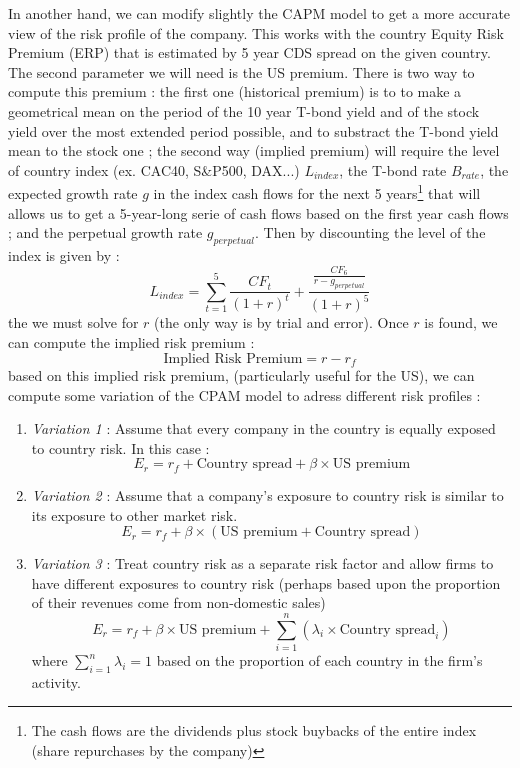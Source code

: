 In another hand, we can modify slightly the CAPM model to get a more accurate view of  the risk profile of the company. This works with the country Equity Risk Premium (ERP) that is estimated by 5 year CDS spread on the given country. The second parameter we will need is the US premium. There is two way to compute this premium : the first one (historical premium) is to to make a geometrical mean on the period of the 10 year T-bond yield and of the stock yield over the most extended period possible, and to substract the T-bond yield mean to the stock one ; the second way (implied premium) will require the level of country index (ex. CAC40, S\&P500, DAX...) $L_{index}$, the T-bond rate $B_{rate}$, the expected growth rate $g$ in the index cash flows for the next 5 years\footnote{The cash flows are the dividends plus stock buybacks of the entire index (share repurchases by the company)} that will allows us to get a 5-year-long serie of cash flows based on the first year cash flows ; and the perpetual growth rate $g_{perpetual}$. Then  by discounting the level of the index is given by :
\begin{equation}
L_{index} = \sum^5_{t=1}\frac{CF_t}{(1+r)^t} + \displaystyle\frac{\frac{CF_6}{r-g_{perpetual}}}{(1+r)^5}
\end{equation}
the we must solve for $r$ (the only way is by trial and error). Once $r$ is found, we can compute the implied risk premium : 
\begin{equation}
    \text{Implied Risk Premium} = r - r_f
\end{equation}
based on this implied risk premium, (particularly useful for the US), we can compute some variation of the CPAM model to adress different risk profiles : 

\begin{enumerate}
    \item \textit{Variation 1} : Assume that every company in the country is equally exposed to country risk. In this case :
    \begin{equation}
        E_r = r_f + \text{Country spread} +\beta \times \text{US premium}
    \end{equation}


    \item \textit{Variation 2} : Assume that a company’s exposure to country risk is similar to its exposure to other market risk.
    \begin{equation}
        E_r = r_f + \beta\times(\text{US premium}+\text{Country spread})
    \end{equation}

    \item \textit{Variation 3} : Treat country risk as a separate risk factor and allow firms to have different exposures to country risk (perhaps based upon the proportion of their revenues come from non-domestic sales) 
    \begin{equation}
        E_r = r_f + \beta \times \text{US premium} + \sum_{i=1}^n(\lambda_i \times \text{Country spread}_i)
    \end{equation}
    where $\sum_{i=1}^n\lambda_i = 1$ based on the proportion of each country in the firm's activity.
\end{enumerate} 

